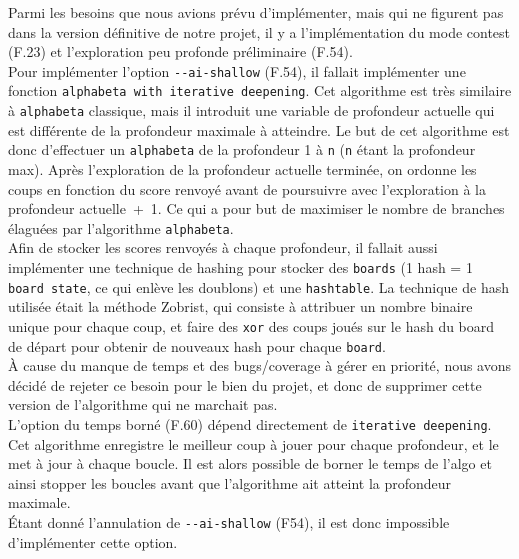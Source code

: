 \documentclass[a4paper,12pt]{article}
\begin{document}
Parmi les besoins que nous avions prévu d’implémenter, mais qui ne figurent pas
dans la version définitive de notre projet, il y a l’implémentation du mode
contest (F.23) et l’exploration peu profonde préliminaire (F.54).\\ Pour
implémenter l’option \texttt{-}\texttt{-ai-shallow} (F.54), il fallait
implémenter une fonction \texttt{alphabeta with iterative deepening}. Cet
algorithme est très similaire à \texttt{alphabeta} classique, mais il introduit
une variable de profondeur actuelle qui est différente de la profondeur
maximale à atteindre. Le but de cet algorithme est donc d’effectuer un
\texttt{alphabeta} de la profondeur 1 à \texttt{n} (\texttt{n} étant la
profondeur max). Après l’exploration de la profondeur actuelle terminée, on
ordonne les coups en fonction du score renvoyé avant de poursuivre avec
l’exploration à la profondeur actuelle~+~1. Ce qui a pour but de maximiser le
nombre de branches élaguées par l’algorithme \texttt{alphabeta}.\\ Afin de
stocker les scores renvoyés à chaque profondeur, il fallait aussi implémenter
une technique de hashing pour stocker des \texttt{boards} (1 hash = 1
\texttt{board state}, ce qui enlève les doublons) et une \texttt{hashtable}. La
technique de hash utilisée était la méthode Zobrist, qui consiste à attribuer
un nombre binaire unique pour chaque coup, et faire des \texttt{xor} des coups
joués sur le hash du board de départ pour obtenir de nouveaux hash pour chaque
\texttt{board}.\\ À cause du manque de temps et des bugs/coverage à gérer en
priorité, nous avons décidé de rejeter ce besoin pour le bien du projet, et
donc de supprimer cette version de l’algorithme qui ne marchait pas.\\ L’option
du temps borné (F.60) dépend directement de \texttt{iterative deepening}. Cet
algorithme enregistre le meilleur coup à jouer pour chaque profondeur, et le
met à jour à chaque boucle. Il est alors possible de borner le temps de l’algo
et ainsi stopper les boucles avant que l’algorithme ait atteint la profondeur
maximale.\\ Étant donné l’annulation de \texttt{-}\texttt{-ai-shallow} (F54),
il est donc impossible d’implémenter cette option.\\
\end{document}
